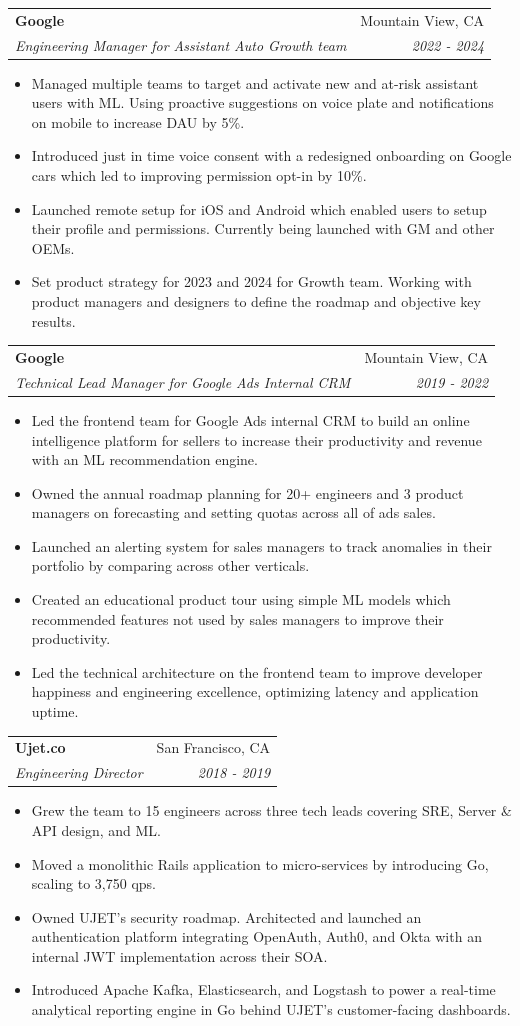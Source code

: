 \documentclass[letterpaper,11pt]{article}
\makeatletter
\newcommand{\resumeSubheading}[4]{
  \vspace{-1pt}\item
    \begin{tabular*}{0.97\textwidth}[t]{l@{\extracolsep{\fill}}r}
      \textbf{#1} & #2 \\
      \textit{\small#3} & \textit{\small #4} \\
    \end{tabular*}\vspace{-5pt}
}
\newcommand{\resumeItemListStart}{\begin{itemize}}
\newcommand{\resumeItemListEnd}{\end{itemize}\vspace{-5pt}}
\makeatother
\begin{document}
    \resumeSubheading
    {Google}{Mountain View, CA}
    {Engineering Manager for Assistant Auto Growth team}{2022 - 2024}
    \resumeItemListStart
      \item Managed multiple teams to target and activate new and at-risk assistant users with ML. Using proactive suggestions on voice plate and notifications on mobile to increase DAU by 5\%.
      \item Introduced just in time voice consent with a redesigned onboarding on Google cars which led to improving permission opt-in by 10\%.
      \item Launched remote setup for iOS and Android which enabled users to setup their profile and permissions. Currently being launched with GM and other OEMs.
      \item Set product strategy for 2023 and 2024 for Growth team. Working with product managers and designers to define the roadmap and objective key results.
    \resumeItemListEnd

    \resumeSubheading
      {Google}{Mountain View, CA}
      {Technical Lead Manager for Google Ads Internal CRM}{2019 - 2022}
      \resumeItemListStart
        \item Led the frontend team for Google Ads internal CRM to build an online intelligence platform for sellers to increase their productivity and revenue with an ML recommendation engine.
        \item Owned the annual roadmap planning for 20+ engineers and 3 product managers on forecasting and setting quotas across all of ads sales.
        \item Launched an alerting system for sales managers to track anomalies in their portfolio by comparing across other verticals.
        \item Created an educational product tour using simple ML models which recommended features not used by sales managers to improve their productivity.
        \item Led the technical architecture on the frontend team to improve developer happiness and engineering excellence, optimizing latency and application uptime.
      \resumeItemListEnd

      \resumeSubheading
        {Ujet.co}{San Francisco, CA}
        {Engineering Director}{2018 - 2019}
      \resumeItemListStart
        \item Grew the team to 15 engineers across three tech leads covering SRE, Server \& API design, and ML.
        \item Moved a monolithic Rails application to micro-services by introducing Go, scaling to 3,750 qps.
        \item Owned UJET's security roadmap. Architected and launched an authentication platform integrating OpenAuth, Auth0, and Okta with an internal JWT implementation across their SOA.
        \item Introduced Apache Kafka, Elasticsearch, and Logstash to power a real-time analytical reporting engine in Go behind UJET's customer-facing dashboards.
      \resumeItemListEnd
\end{document}
